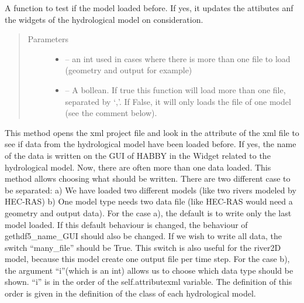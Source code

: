 \documentclass[letterpaper,10pt,english]{sphinxmanual}
\begin{document}
\begin{fulllineitems}
\begin{fulllineitems}
\label{\detokenize{index:src_GUI.hydro_GUI_2.SubHydroW.was_model_loaded_before}}
A function to test if the model loaded before. If yes, it updates the attibutes anf the widgets of the
hydrological model on consideration.
\begin{quote}\begin{description}
\item[{Parameters}] \leavevmode\begin{itemize}
\item {} 
 -- an int used in cases where there is more than one file to load (geometry and output for example)

\item {} 
 -- A bollean. If true this function will load more than one file, separated by `,'. If False,
it will only loads the file of one model (see the comment below).

\end{itemize}

\end{description}\end{quote}


This method opens the xml project file and look in the attribute of the xml file to see if data from the
hydrological model have been loaded before. If yes, the name of the data is written on the GUI of HABBY in the
Widget related to the hydrological model. Now, there are often more than one data loaded. This method allows
choosing what should be written. There are two different case to be separated: a) We have loaded two different
models (like two rivers modeled by HEC-RAS) b) One model type needs two data file (like HEC-RAS would need a
geometry and output data). For the case a), the default is to write only the last model loaded. If this
default behaviour is changed, the behaviour of gethdf5\_name\_GUI should also be changed. If we wish to
write all data, the switch “many\_file” should be True. This switch is also useful for the river2D model, because
this model create one output file per time step. For the case b), the argument “i”(which is an int) allows us to
choose which data type should be shown. “i” is in the order of the self.attributexml variable. The definition of
this order is given in the definition of the class of each hydrological model.

\end{fulllineitems}


\end{fulllineitems}
\end{document}
